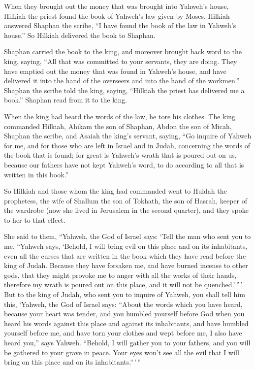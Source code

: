  When they brought out the money that was brought into
Yahweh's house, Hilkiah the priest found the book of Yahweh's law given
by Moses.  Hilkiah answered Shaphan the scribe, ``I have
found the book of the law in Yahweh's house.'' So Hilkiah delivered the
book to Shaphan.

 Shaphan carried the book to the king, and moreover
brought back word to the king, saying, ``All that was committed to your
servants, they are doing.  They have emptied out the
money that was found in Yahweh's house, and have delivered it into the
hand of the overseers and into the hand of the workmen.''
 Shaphan the scribe told the king, saying, ``Hilkiah the
priest has delivered me a book.'' Shaphan read from it to the king.

 When the king had heard the words of the law, he tore
his clothes.  The king commanded Hilkiah, Ahikam the son
of Shaphan, Abdon the son of Micah, Shaphan the scribe, and Asaiah the
king's servant, saying,  ``Go inquire of Yahweh for me,
and for those who are left in Israel and in Judah, concerning the words
of the book that is found; for great is Yahweh's wrath that is poured
out on us, because our fathers have not kept Yahweh's word, to do
according to all that is written in this book.''

 So Hilkiah and those whom the king had commanded went to
Huldah the prophetess, the wife of Shallum the son of Tokhath, the son
of Hasrah, keeper of the wardrobe (now she lived in Jerusalem in the
second quarter), and they spoke to her to that effect.

 She said to them, ``Yahweh, the God of Israel says:
`Tell the man who sent you to me,  ``Yahweh says,
`Behold, I will bring evil on this place and on its inhabitants, even
all the curses that are written in the book which they have read before
the king of Judah.  Because they have forsaken me, and
have burned incense to other gods, that they might provoke me to anger
with all the works of their hands, therefore my wrath is poured out on
this place, and it will not be quenched.'\,''\,'  But to
the king of Judah, who sent you to inquire of Yahweh, you shall tell him
this, `Yahweh, the God of Israel says: ``About the words which you have
heard,  because your heart was tender, and you humbled
yourself before God when you heard his words against this place and
against its inhabitants, and have humbled yourself before me, and have
torn your clothes and wept before me, I also have heard you,'' says
Yahweh.  ``Behold, I will gather you to your fathers, and
you will be gathered to your grave in peace. Your eyes won't see all the
evil that I will bring on this place and on its inhabitants.''\,'\,''

